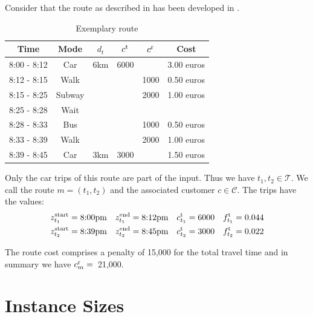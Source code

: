 \begin{example}

Consider that the route as described in  has been developed in . 

\begin{table}[htb]
	\centering
	\begin{tabular}{cccccc}
		Time & Mode & $d_t$ & $c^{\operatorname{t}}$ & $c^{\operatorname{r}}$ & Cost \\
		\hline
		8:00 - 8:12 & Car & 6km & 6000 & & 3.00 euros \\
		8:12 - 8:15 & Walk & & & 1000 & 0.50 euros \\
		8:15 - 8:25	& Subway & & & 2000 & 1.00 euros \\
		8:25 - 8:28 & Wait & & & & \\
		8:28 - 8:33 & Bus & & & 1000 & 0.50 euros \\
		8:33 - 8:39 & Walk & & & 2000 & 1.00 euros \\
		8:39 - 8:45 & Car & 3km & 3000 & & 1.50 euros
	\end{tabular}
	\caption{Exemplary route}
	\label{tab:exemplary_route}
\end{table}

Only the car trips of this route are part of the input. Thus we have $t_1,t_2\in\mathcal{T}$. We call the route ${m=\left(t_1,t_2\right)}$ and the associated customer $c\in\mathcal{C}$. The trips have the values:
\begin{align*}
	z^{\operatorname{start}}_{t_1} = \text{8:00pm} && z^{\operatorname{end}}_{t_1} = \text{8:12pm} && c^{\operatorname{t}}_{t_1} = 6000 && f^{\operatorname{t}}_{t_1} = 0.044 \\
	z^{\operatorname{start}}_{t_2} = \text{8:39pm} && z^{\operatorname{end}}_{t_2} = \text{8:45pm} && c^{\operatorname{t}}_{t_2} = 3000 && f^{\operatorname{t}}_{t_2} = 0.022
\end{align*}

The route cost comprises a penalty of 15,000 for the total travel time and in summary we have ${c^{\operatorname{r}}_m =}$~21,000.

\end{example}

\section{Instance Sizes}





